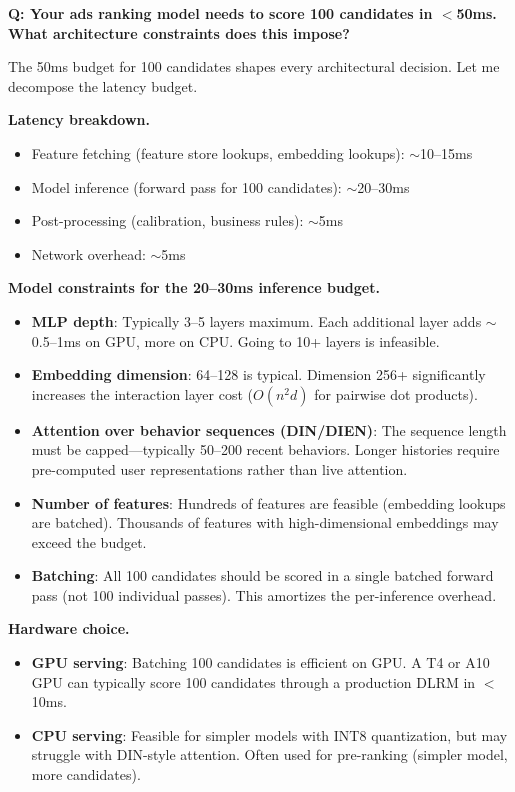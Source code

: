 \begin{interviewq}
\textbf{Q: Your ads ranking model needs to score 100 candidates in $<$50ms. What architecture constraints does this impose?}

 \quad {} \quad \badgefreq{\freqmed}

\stronganswer

The 50ms budget for 100 candidates shapes every architectural decision. Let me decompose the latency budget.

\textbf{Latency breakdown.}
\begin{itemize}
    \item Feature fetching (feature store lookups, embedding lookups): $\sim$10--15ms
    \item Model inference (forward pass for 100 candidates): $\sim$20--30ms
    \item Post-processing (calibration, business rules): $\sim$5ms
    \item Network overhead: $\sim$5ms
\end{itemize}

\textbf{Model constraints for the 20--30ms inference budget.}
\begin{itemize}
    \item \textbf{MLP depth}: Typically 3--5 layers maximum. Each additional layer adds $\sim$0.5--1ms on GPU, more on CPU. Going to 10+ layers is infeasible.
    \item \textbf{Embedding dimension}: 64--128 is typical. Dimension 256+ significantly increases the interaction layer cost ($O(n^2 d)$ for pairwise dot products).
    \item \textbf{Attention over behavior sequences (DIN/DIEN)}: The sequence length must be capped---typically 50--200 recent behaviors. Longer histories require pre-computed user representations rather than live attention.
    \item \textbf{Number of features}: Hundreds of features are feasible (embedding lookups are batched). Thousands of features with high-dimensional embeddings may exceed the budget.
    \item \textbf{Batching}: All 100 candidates should be scored in a single batched forward pass (not 100 individual passes). This amortizes the per-inference overhead.
\end{itemize}

\textbf{Hardware choice.}
\begin{itemize}
    \item \textbf{GPU serving}: Batching 100 candidates is efficient on GPU. A T4 or A10 GPU can typically score 100 candidates through a production DLRM in $<$10ms.
    \item \textbf{CPU serving}: Feasible for simpler models with INT8 quantization, but may struggle with DIN-style attention. Often used for pre-ranking (simpler model, more candidates).
\end{itemize}


\end{interviewq}

